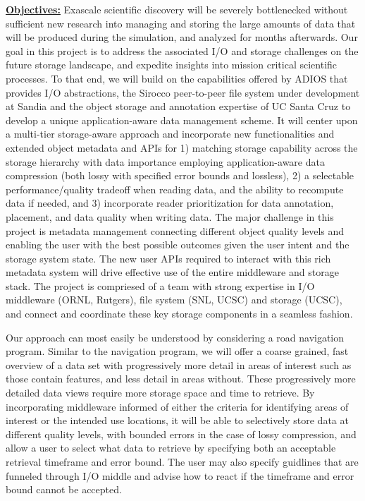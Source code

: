 \documentclass[11pt,letterpaper]{article}
\begin{document}
\underline{\textbf{Objectives:}}
Exascale scientific discovery will be severely bottlenecked without sufficient
new research into managing and storing the large amounts of data that will be
produced during the simulation, and analyzed for months afterwards.  Our goal
in this project is to address the associated I/O and storage challenges on the
future storage landscape, and expedite insights into mission critical
scientific processes. To that end, we will build on the capabilities offered
by ADIOS that provides I/O abstractions, 
the Sirocco peer-to-peer file system under development at Sandia and the
object storage and annotation expertise of UC Santa Cruz to develop a unique
application-aware data management scheme. It will center upon
a multi-tier storage-aware approach and incorporate new
functionalities and extended object metadata and APIs for 1) matching
storage capability across the storage hierarchy with data importance employing
application-aware data compression (both lossy with specified error bounds and
lossless), 2) a selectable performance/quality tradeoff when reading data, and
the ability to recompute data if needed, and
3) incorporate reader prioritization for data annotation, placement, and data
quality when writing data.  The major challenge in this project is metadata
management connecting different object quality levels and enabling the user
with the best possible outcomes given the user intent and the storage system state. The new user
APIs required to interact with this rich metadata system will drive effective
use of the entire middleware and storage stack. The project is compriesed of a
team with strong expertise in I/O middleware (ORNL, Rutgers), file system (SNL,
UCSC) and storage (UCSC), and connect and coordinate these key storage
components in a seamless fashion.

Our approach can most easily be understood by considering a road navigation
program. Similar to the navigation program, we will offer a coarse grained,
fast overview of a data set with progressively more detail in areas of interest
such as those contain features, and less detail in areas without. These progressively
more detailed data views require more storage space and time to retrieve. By
incorporating middleware informed of either the criteria for identifying areas of interest
or the intended use locations, it will be able to selectively store
data at different quality levels, with bounded errors in the case of lossy
compression, and allow a user to select what data to retrieve by specifying
both an acceptable retrieval timeframe and error bound. 
The user may also specify guidlines that are funneled through I/O middle and 
advise how to react if the timeframe and error bound cannot be accepted.
\end{document}
